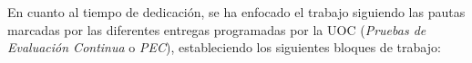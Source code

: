 \documentclass[IB,BIB]{TFUOC}%
\begin{document}
En cuanto al tiempo de dedicación, se ha enfocado el trabajo siguiendo las pautas marcadas por las diferentes entregas programadas por la UOC (\textit{Pruebas de Evaluación Continua} o \textit{PEC}), estableciendo los siguientes bloques de trabajo:

\end{document}
